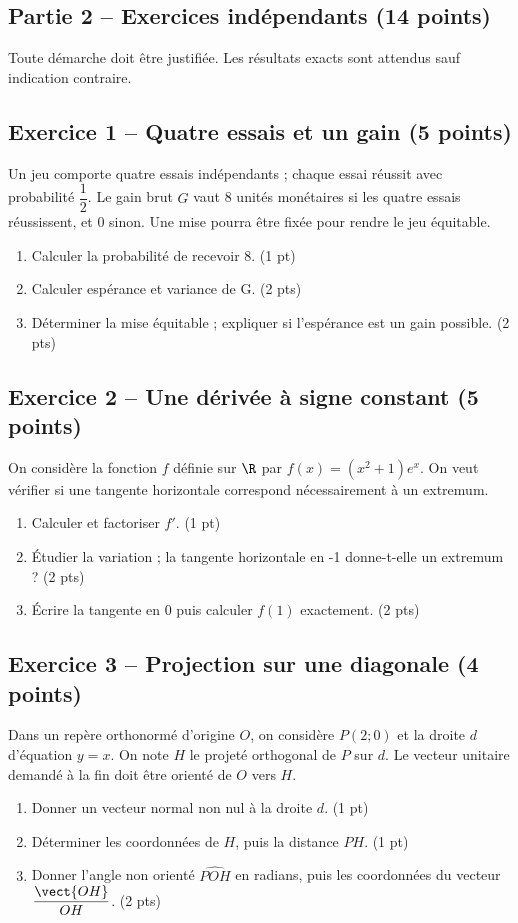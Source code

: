 \clearpage\subsection*{Partie 2 -- Exercices indépendants (14 points)}
Toute démarche doit être justifiée. Les résultats exacts sont attendus sauf indication contraire.
\subsection*{Exercice 1 -- Quatre essais et un gain (5 points)}
Un jeu comporte quatre essais indépendants ; chaque essai réussit avec probabilité $\dfrac12$. Le gain brut $G$ vaut 8 unités monétaires si les quatre essais réussissent, et 0 sinon. Une mise pourra être fixée pour rendre le jeu équitable.
\begin{enumerate}
\item Calculer la probabilité de recevoir 8. \hfill(1 pt)
\item Calculer espérance et variance de G. \hfill(2 pts)
\item Déterminer la mise équitable ; expliquer si l’espérance est un gain possible. \hfill(2 pts)
\end{enumerate}
\subsection*{Exercice 2 -- Une dérivée à signe constant (5 points)}
On considère la fonction $f$ définie sur $\R$ par $f(x)=(x^2+1)e^x$. On veut vérifier si une tangente horizontale correspond nécessairement à un extremum.
\begin{enumerate}
\item Calculer et factoriser $f\prime$. \hfill(1 pt)
\item Étudier la variation ; la tangente horizontale en -1 donne-t-elle un extremum ? \hfill(2 pts)
\item Écrire la tangente en 0 puis calculer $f(1)$ exactement. \hfill(2 pts)
\end{enumerate}
\subsection*{Exercice 3 -- Projection sur une diagonale (4 points)}
Dans un repère orthonormé d’origine $O$, on considère $P(2;0)$ et la droite $d$ d’équation $y=x$. On note $H$ le projeté orthogonal de $P$ sur $d$. Le vecteur unitaire demandé à la fin doit être orienté de $O$ vers $H$.
\begin{enumerate}
\item Donner un vecteur normal non nul à la droite $d$. \hfill(1 pt)
\item Déterminer les coordonnées de $H$, puis la distance $PH$. \hfill(1 pt)
\item Donner l’angle non orienté $\widehat{POH}$ en radians, puis les coordonnées du vecteur $\dfrac{\vect{OH}}{OH}$. \hfill(2 pts)
\end{enumerate}
